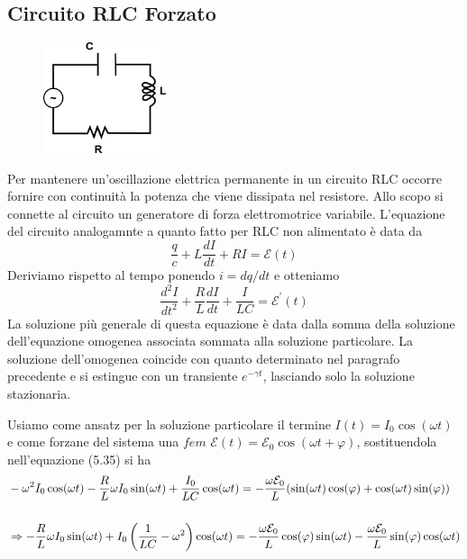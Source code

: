\subsection{Circuito RLC Forzato}
\begin{figure} %
    \centering
    \includegraphics[width=0.32\textwidth]{images/RLC_alternate} %
\end{figure}
Per mantenere un'oscillazione elettrica permanente in un circuito RLC occorre fornire con continuit\`a la potenza che viene dissipata nel resistore. Allo scopo si connette al circuito un generatore di forza elettromotrice variabile. L'equazione del circuito analogamnte a quanto fatto per RLC non alimentato \`e data da
\begin{equation*}
	\frac{q}{c} + L \frac{dI}{dt} + RI =  \mathcal{E}(t)
\end{equation*}
Deriviamo rispetto al tempo ponendo $i = dq/dt$ e otteniamo 
\begin{equation}
	\frac{d^2I}{dt^2} + \frac{R}{L} \frac{dI}{dt} + \frac{I}{LC} = \mathcal{E}^\prime (t)
\end{equation}
La soluzione pi\`u generale di questa equazione \`e data dalla somma della soluzione dell'equazione omogenea associata sommata alla soluzione particolare. La soluzione dell'omogenea coincide con quanto determinato nel paragrafo precedente e si estingue con un transiente $e^{-\gamma t}$, lasciando solo la soluzione stazionaria.

Usiamo come ansatz per la soluzione particolare il termine $I(t) = I_0 \cos(\omega t)$ e come forzane del sistema una $fem$ $\mathcal{E}(t) = \mathcal{E}_0 \cos(\omega t + \varphi)$, sostituendola nell'equazione (5.35) si ha
\begin{align*}
	& - \omega^2 I_0 \cos(\omega t) - \frac{R}{L} \omega I_0 \sin(\omega t)+ \frac{I_0}{LC} \cos(\omega t) = - \frac{\omega \mathcal{E}_0}{L}(\sin(\omega t)\cos(\varphi) + \cos(\omega t)\sin(\varphi)) \\ \rule{0pt}{30pt}
	& \Rightarrow -\frac{R}{L}\omega I_0 \sin(\omega t) + I_0 \left(\frac{1}{LC} - \omega^2\right)\cos(\omega t) = - \frac{\omega \mathcal{E}_0}{L}\cos(\varphi)\sin(\omega t) - \frac{\omega \mathcal{E}_0}{L}\sin(\varphi)\cos(\omega t)
\end{align*}

